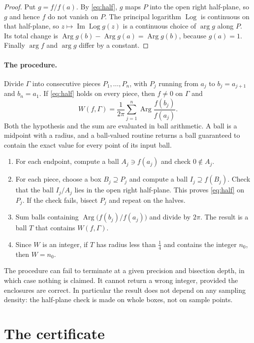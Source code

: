 \documentclass[11pt,a4paper]{article}
\theoremstyle{definition}
\DeclareMathOperator{\im}{Im}
\DeclareMathOperator{\Arg}{Arg}
\DeclareMathOperator{\Log}{Log}
\begin{document}
\begin{proof}
Put $g=f/f(a)$. By \eqref{eq:half}, $g$ maps $P$ into the open right
half-plane, so $g$ and hence $f$ do not vanish on $P$. The principal logarithm
$\Log$ is continuous on that half-plane, so $z\mapsto\im\Log g(z)$ is a
continuous choice of $\arg g$ along $P$. Its total change is
$\Arg g(b)-\Arg g(a)=\Arg g(b)$, because $g(a)=1$. Finally $\arg f$ and
$\arg g$ differ by a constant.
\end{proof}

\paragraph{The procedure.}
Divide $\Gamma$ into consecutive pieces $P_1,\dots,P_n$, with $P_j$ running
from $a_j$ to $b_j=a_{j+1}$ and $b_n=a_1$. If \eqref{eq:half} holds on every
piece, then $f\neq0$ on $\Gamma$ and
\begin{equation}\label{eq:sum}
  W(f,\Gamma)=\frac{1}{2\pi}\sum_{j=1}^{n}\Arg\frac{f(b_j)}{f(a_j)} .
\end{equation}
Both the hypothesis and the sum are evaluated in ball arithmetic. A ball is a
midpoint with a radius, and a ball-valued routine returns a ball guaranteed to
contain the exact value for every point of its input ball.
\begin{enumerate}[leftmargin=2em]
\item For each endpoint, compute a ball $A_j\ni f(a_j)$ and check
  $0\notin A_j$.
\item For each piece, choose a box $B_j\supseteq P_j$ and compute a ball
  $I_j\supseteq f(B_j)$. Check that the ball $I_j/A_j$ lies in the open right
  half-plane. This proves \eqref{eq:half} on $P_j$. If the check fails, bisect
  $P_j$ and repeat on the halves.
\item Sum balls containing $\Arg\!\big(f(b_j)/f(a_j)\big)$ and divide by
  $2\pi$. The result is a ball $T$ that contains $W(f,\Gamma)$.
\item Since $W$ is an integer, if $T$ has radius less than $\tfrac14$ and
  contains the integer $n_0$, then $W=n_0$.
\end{enumerate}
The procedure can fail to terminate at a given precision and bisection depth,
in which case nothing is claimed. It cannot return a wrong integer, provided
the enclosures are correct. In particular the result does not depend on any
sampling density: the half-plane check is made on whole boxes, not on sample
points.

\section{The certificate}\label{sec:cert}
\end{document}
